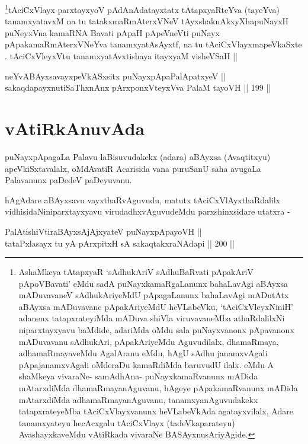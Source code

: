\footnote{AshaMkeya tAtapxyaR `sAdhukAriV sAdhuBaRvati pApakAriV
pApoVBavati' eMdu sadA puNayxkamaRgaLanunx bahaLavAgi aBAyxsa
mADuvavaneV sAdhukAriyeMdU pApagaLanunx bahaLavAgi mADutAtx aBAyxsa
mADuvavane pApakAriyeMdU heVLabeVku, `tAciCxVleyxNiniH' adanenx
tatapxrateyiMda mADuva shiVla viruvavaneMba athaRdalilxNi
niparxtayxyavu baMdide, adariMda oMdu sala puNayxvanonx pApavanonx
mADuvavanu sAdhukAri, pApakAriyeMdu Aguvudilalx, dhamaRmaya,
adhamaRmayaveMdu AgalAranu eMdu, hAgU sAdhu janamxvAgali
pApajanamxvAgali oMderaDu kamaRdiMda baruvudU ilalx. eMdu A shaMkeya
vivaraNe- samAdhAna- puNayxkamaRvanunx mADida mAtarxdiMda
dhamaRmayanAguvanu, hAgeye pApakamaRvanunx mADida mAtarxdiMda
adhamaRmayanAguvanu, tanamxyanAguvudakekx tatapxrateyeMba
tAciCxVlayxvanunx heVLabeVkAda agatayxvilalx, Adare tanamxyateyu
hecAcxgalu tAciCxVlayx (tadeVkaparateyu) AvashayxkaveMdu vAtiRkada
vivaraNe BASAyxnusAriyAgide.}tAciCxVlayx parxtayxyoV pAdAnAdatayxtatx tAtapxyaRteYva (tayeYva) tanamxyatavxM na tu tatakxmaRmAterxVNeV tAyxshaknAkxyX\s \s hapuNayxH puNeyxVna kamaRNA Bavati pApaH pApeVneVti puNayx pApakamaRmAterxVNeYva tanamxyatAsAyxtf, na tu tAciCxVlayxmapeVkaSxte . tAciCxVleyxVtu tanamxyatAvxtishaya itayxyaM visheVSaH ||


\begin{shl}
neYvABAyxsavayxpeVkASx\s sitx puNayxpApaPalApatxyeV || \\
sakaqdapayxnutiSaThxnAnx pArxponxVteyxVva PalaM tayoVH \hfill || 199 || 
\end{shl}

\section*{vAtiRkAnuvAda}

\begin{artha}
puNayxpApagaLa Palavu laBisuvudakekx (adara) aBAyxsa (Avaqtitxyu)
apeVkiSxtavalalx, oMdAvatiR Acarisida vana puruSanU saha avugaLa
Palavanunx paDedeV paDeyuvanu.
\end{artha}

\begin{artha}
hAgAdare aBAyxsavu vayxthaRvAguvudu, matutx tAciCxVlAyxthaRdalilx
vidhisidaNiniparxtayxyavu virudadhxvAguvudeMdu parxshinxsidare utatxra -
\end{artha}

\begin{shl}
PalAtishiVtiraBAyxsAjAjxyateV puNayxpApayoVH || \\
tataPxlasayx tu yA pArxpitxH sA sakaqtakxraNAdapi \hfill || 200 ||  
\end{shl}

